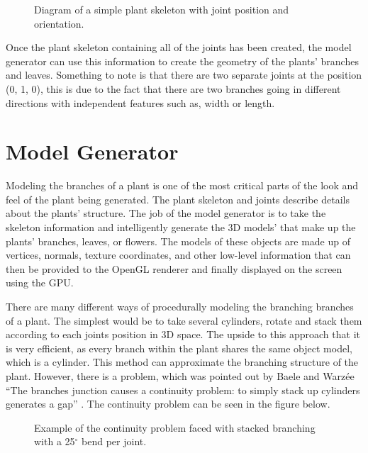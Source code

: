 \begin{figure}[htbp]
	{\centering
		\vspace{7px}
		\setlength{\fboxrule}{1pt}
		\caption{Diagram of a simple plant skeleton with joint position and orientation.} \label{skeleton diagram}
	}
\end{figure}
\FloatBarrier

Once the plant skeleton containing all of the joints has been created, the model generator can use this information to create the geometry of the plants' branches and leaves. Something to note is that there are two separate joints at the position (0, 1, 0), this is due to the fact that there are two branches going in different directions with independent features such as, width or length. 

\section{Model Generator}

Modeling the branches of a plant is one of the most critical parts of the look and feel of the plant being generated. The plant skeleton and joints describe details about the plants' structure. The job of the model generator is to take the skeleton information and intelligently generate the 3D models' that make up the plants' branches, leaves, or flowers. The models of these objects are made up of vertices, normals, texture coordinates, and other low-level information that can then be provided to the OpenGL renderer and finally displayed on the screen using the GPU.

There are many different ways of procedurally modeling the branching branches of a plant. The simplest would be to take several cylinders, rotate and stack them according to each joints position in 3D space. The upside to this approach that it is very efficient, as every branch within the plant shares the same object model, which is a cylinder. This method can approximate the branching structure of the plant. However, there is a problem, which was pointed out by Baele and Warz\'{e}e ``The branches junction causes a continuity problem: to simply stack up cylinders generates a gap'' \cite{baele2005real}. The continuity problem can be seen in the figure below.

\begin{figure}[htbp]
	{\centering
		\vspace{7px}
		\setlength{\fboxrule}{1pt}
		\caption{Example of the continuity problem faced with stacked branching with a 25$^{\circ}$ bend per joint.}
	}
\end{figure}

